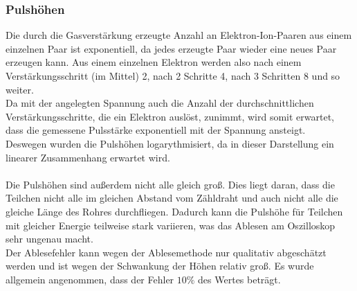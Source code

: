 \documentclass[12pt,a4paper]{article}
\begin{document}
\subsubsection{Pulshöhen}

Die durch die Gasverstärkung erzeugte Anzahl an Elektron-Ion-Paaren aus einem einzelnen Paar ist exponentiell, da jedes erzeugte Paar wieder eine neues Paar erzeugen kann. Aus einem einzelnen Elektron werden also nach einem Verstärkungsschritt (im Mittel) 2, nach 2 Schritte 4, nach 3 Schritten 8 und so weiter.\\
Da mit der angelegten Spannung auch die Anzahl der durchschnittlichen Verstärkungsschritte, die ein Elektron auslöst, zunimmt, wird somit erwartet, dass die gemessene Pulsstärke exponentiell mit der Spannung ansteigt.\\
Deswegen wurden die Pulshöhen logarythmisiert, da in dieser Darstellung ein linearer Zusammenhang erwartet wird.\\
\\
Die Pulshöhen sind außerdem nicht alle gleich groß. Dies liegt daran, dass die Teilchen nicht alle im gleichen Abstand vom Zähldraht und auch nicht alle die gleiche Länge des Rohres durchfliegen. Dadurch kann die Pulshöhe für Teilchen mit gleicher Energie teilweise stark variieren, was das Ablesen am Oszilloskop sehr ungenau macht.\\
Der Ablesefehler kann wegen der Ablesemethode nur qualitativ abgeschätzt werden und ist wegen der Schwankung der Höhen relativ groß. Es wurde allgemein angenommen, dass der Fehler $10\%$ des Wertes beträgt.
\end{document}

